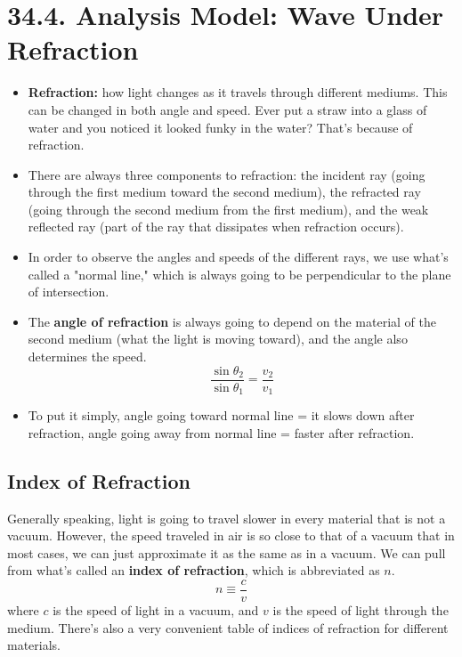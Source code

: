 \documentclass[12pt, letterpaper]{article}
\begin{document}
\section*{34.4. Analysis Model: Wave Under Refraction}

\begin{itemize}
    \item \textbf{Refraction:} how light changes as it travels through different mediums. This can be changed in both angle and speed. Ever put a straw into a glass of water and you noticed it looked funky in the water? That's because of refraction.
    \item There are always three components to refraction: the incident ray (going through the first medium toward the second medium), the refracted ray (going through the second medium from the first medium), and the weak reflected ray (part of the ray that dissipates when refraction occurs).
    \item In order to observe the angles and speeds of the different rays, we use what's called a "normal line," which is always going to be perpendicular to the plane of intersection.
    \item The \textbf{angle of refraction} is always going to depend on the material of the second medium (what the light is moving toward), and the angle also determines the speed. \[\frac{\sin{\theta_{2}}}{\sin{\theta_{1}}} = \frac{v_{2}}{v_{1}}\]
    \item To put it simply, angle going toward normal line = it slows down after refraction, angle going away from normal line = faster after refraction.
\end{itemize}

\subsection*{Index of Refraction}
Generally speaking, light is going to travel slower in every material that is not a vacuum. However, the speed traveled in air is so close to that of a vacuum that in most cases, we can just approximate it as the same as in a vacuum. We can pull from what's called an \textbf{index of refraction}, which is abbreviated as $n$. \[n \equiv \frac{c}{v}\] where $c$ is the speed of light in a vacuum, and $v$ is the speed of light through the medium. There's also a very convenient table of indices of refraction for different materials.
\end{document}
